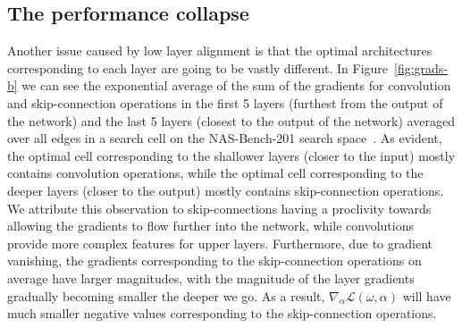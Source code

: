 \documentclass{article} \usepackage{fancyhdr, iclr2023_conference, times}
\newcommand{\lambdafn}{layer alignment\xspace}
\begin{document}
\subsection{The performance collapse}
\par Another issue caused by low \lambdafn is that the optimal architectures corresponding to each layer are going to be vastly different. In Figure~\ref{fig:grads-b} we can see the exponential average of the sum of the gradients for convolution and skip-connection operations in the first 5 layers (furthest from the output of the network) and the last 5 layers (closest to the output of the network) averaged over all edges in a search cell on the NAS-Bench-201 search space~\citep{DBLP:conf/iclr/Dong020}. As evident, the optimal cell corresponding to the shallower layers (closer to the input) mostly contains convolution operations, while the optimal cell corresponding to the deeper layers (closer to the output) mostly contains skip-connection operations. We attribute this observation to skip-connections having a proclivity towards allowing the gradients to flow further into the network, while convolutions provide more complex features for upper layers. Furthermore, due to gradient vanishing, the gradients corresponding to the skip-connection operations on average have larger magnitudes, with the magnitude of the layer gradients gradually becoming smaller the deeper we go. As a result, $\nabla_\alpha \mathcal{L}(\omega, \alpha)$ will have much smaller negative values corresponding to the skip-connection operations.
\end{document}
